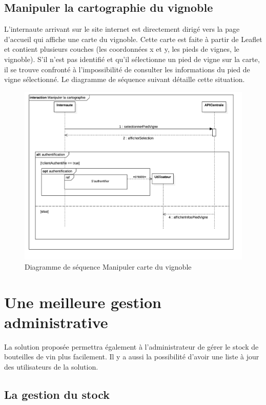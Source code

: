 \documentclass[a4paper, titlepage]{report}
\begin{document}
\subsection{Manipuler la cartographie du vignoble}

L'internaute arrivant sur le site internet est directement dirigé vers
la page d'accueil qui affiche une carte du vignoble. Cette carte est
faite à partir de Leaflet et contient plusieurs couches (les coordonnées
x et y, les pieds de vignes, le vignoble). S'il n'est pas identifié et
qu'il sélectionne un pied de vigne sur la carte, il se trouve confronté
à l'impossibilité de consulter les informations du pied de vigne
sélectionné. Le diagramme de séquence suivant détaille cette situation.

\clearpage
\begin{figure}[!h]
\centering
\includegraphics{Images/SequenceDiagramManipulerCarte.jpg}
\caption{Diagramme de séquence Manipuler carte du vignoble}
\end{figure}

\section{Une meilleure gestion administrative}

La solution proposée permettra également à l'administrateur de gérer le
stock de bouteilles de vin plus facilement. Il y a aussi la possibilité
d'avoir une liste à jour des utilisateurs de la solution.

\subsection{La gestion du stock}
\end{document}
